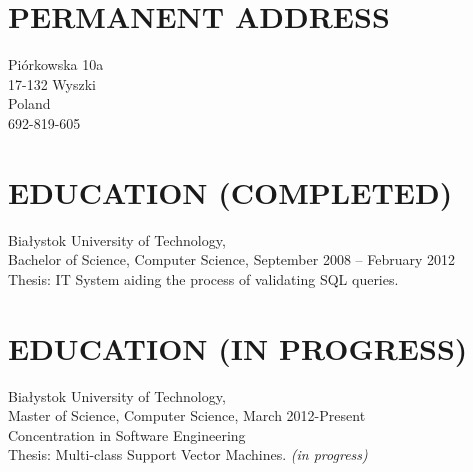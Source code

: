 \documentclass{res}
\begin{document}
 


\begin{resume}
\section{PERMANENT ADDRESS}
Piórkowska 10a\\17-132 Wyszki\\Poland\\692-819-605
                                  

 
\section{EDUCATION (COMPLETED)}
	Białystok University of Technology, \\
	Bachelor of Science, Computer Science, September 2008 -- February 2012 \\
	Thesis: IT System aiding the process of validating SQL queries.

\section{EDUCATION (IN PROGRESS)}
	Białystok University of Technology, \\
	Master of Science, Computer Science, March 2012-Present \\
	Concentration in Software Engineering \\
	Thesis: Multi-class Support Vector Machines. \textit{(in progress)}


\end{resume}
\end{document}
